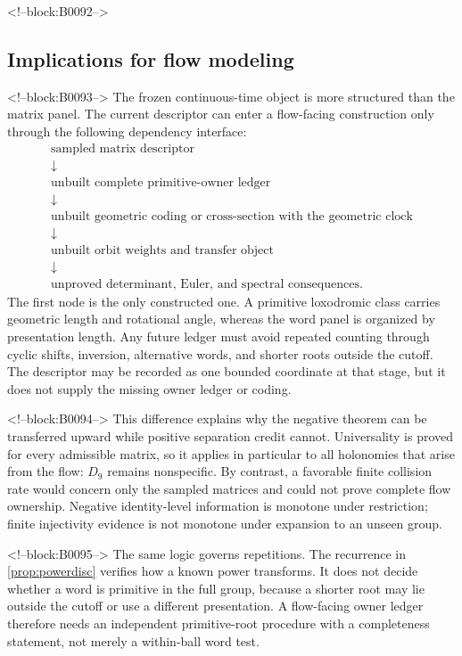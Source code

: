 \documentclass[11pt,a4paper]{article}
\theoremstyle{definition}
\theoremstyle{remark}
\begin{document}
<!--block:B0092-->
\subsection{Implications for flow modeling}

<!--block:B0093-->
The frozen continuous-time object is more structured than the matrix panel. The current descriptor can enter a flow-facing construction only through the following dependency interface:
\[
\begin{array}{c}
 \text{sampled matrix descriptor}\\
 \downarrow\\
 \text{unbuilt complete primitive-owner ledger}\\
 \downarrow\\
 \text{unbuilt geometric coding or cross-section with the geometric clock}\\
 \downarrow\\
 \text{unbuilt orbit weights and transfer object}\\
 \downarrow\\
 \text{unproved determinant, Euler, and spectral consequences}.
\end{array}
\]
The first node is the only constructed one. A primitive loxodromic class carries geometric length and rotational angle, whereas the word panel is organized by presentation length. Any future ledger must avoid repeated counting through cyclic shifts, inversion, alternative words, and shorter roots outside the cutoff. The descriptor may be recorded as one bounded coordinate at that stage, but it does not supply the missing owner ledger or coding.

<!--block:B0094-->
This difference explains why the negative theorem can be transferred upward while positive separation credit cannot. Universality is proved for every admissible matrix, so it applies in particular to all holonomies that arise from the flow: \(D_9\) remains nonspecific. By contrast, a favorable finite collision rate would concern only the sampled matrices and could not prove complete flow ownership. Negative identity-level information is monotone under restriction; finite injectivity evidence is not monotone under expansion to an unseen group.

<!--block:B0095-->
The same logic governs repetitions. The recurrence in \cref{prop:powerdisc} verifies how a known power transforms. It does not decide whether a word is primitive in the full group, because a shorter root may lie outside the cutoff or use a different presentation. A flow-facing owner ledger therefore needs an independent primitive-root procedure with a completeness statement, not merely a within-ball word test.
\end{document}
